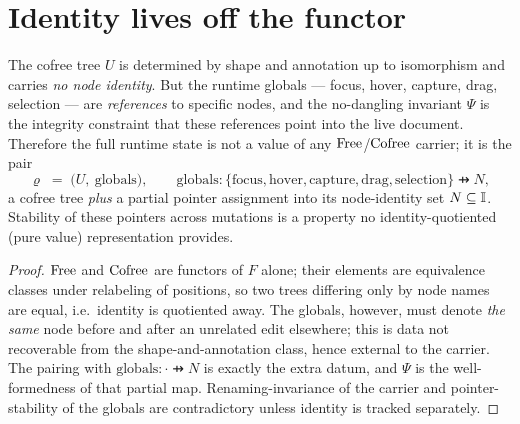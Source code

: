 \documentclass[../uxoxo-main]{subfiles}
\begin{document}
\section{Identity lives off the functor}\label{sec:identity}
\begin{proposition}\label{prop:identity}
The cofree tree $U$ is determined by shape and annotation up to isomorphism and
carries \emph{no node identity}. But the runtime globals --- focus, hover, capture,
drag, selection --- are \emph{references} to specific nodes, and the no-dangling
invariant $\Psi$ is the integrity constraint that these references point into the
live document. Therefore the full runtime state is not a value of any
$\mathrm{Free}$/$\mathrm{Cofree}$ carrier; it is the pair
\[
  \varrho \;=\; \bigl(U,\ \mathrm{globals}\bigr),\qquad
  \mathrm{globals} : \{\mathrm{focus},\mathrm{hover},\mathrm{capture},\mathrm{drag},\mathrm{selection}\}\pfun N,
\]
a cofree tree \emph{plus} a partial pointer assignment into its node-identity set
$N\subseteq\mathbb{I}$. Stability of these pointers across mutations is a property no
identity-quotiented (pure value) representation provides.
\end{proposition}

\begin{proof}
$\mathrm{Free}$ and $\mathrm{Cofree}$ are functors of $F$ alone; their elements are equivalence
classes under relabeling of positions, so two trees differing only by node names are
equal, i.e.\ identity is quotiented away. The globals, however, must denote
\emph{the same} node before and after an unrelated edit elsewhere; this is data not
recoverable from the shape-and-annotation class, hence external to the carrier. The
pairing with $\mathrm{globals}:\cdot\pfun N$ is exactly the extra datum, and $\Psi$
is the well-formedness of that partial map. Renaming-invariance of the carrier and
pointer-stability of the globals are contradictory unless identity is tracked
separately.
\end{proof}
\end{document}
